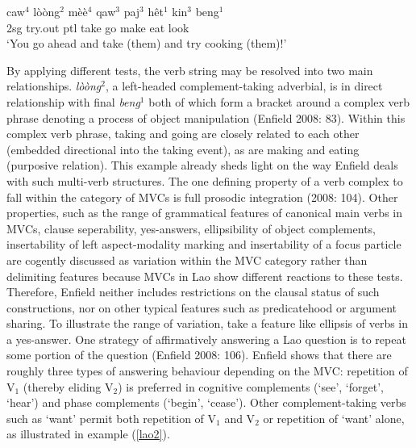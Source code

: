 \ea \label{lao1}
\gll caw$^4$ lòòng$^2$ mèè$^4$ qaw$^3$ paj$^3$ hêt$^1$ kin$^3$ beng$^1$ \\
\acs{2}\acs{sg} try.out \acs{ptl} take go make eat look \\
\glft `You go ahead and take (them) and try cooking (them)!' \\ 
\z
\xe

By applying different tests, the verb string may be resolved into two main relationships. \textit{lòòng$^2$}, a left-headed complement-taking adverbial, is in direct relationship with final \textit{beng$^1$} both of which form a bracket around a complex verb phrase denoting a process of object manipulation (Enfield 2008: 83). Within this complex verb phrase, taking and going are closely related to each other (embedded directional into the taking event), as are making and eating (purposive relation). This example already sheds light on the way Enfield deals with such multi-verb structures. The one defining property of a verb complex to fall within the category of MVCs is full prosodic integration (2008: 104). Other properties, such as the range of grammatical features of canonical main verbs in MVCs, clause seperability, yes-answers, ellipsibility of object complements, insertability of left aspect-modality marking and insertability of a focus particle are cogently discussed as variation within the MVC category rather than delimiting features because MVCs in Lao show different reactions to these tests. Therefore, Enfield neither includes restrictions on the clausal status of such constructions, nor on other typical features such as predicatehood or argument sharing. To illustrate the range of variation, take a feature like ellipsis of verbs in a yes-answer. One strategy of affirmatively answering a Lao question is to repeat some portion of the question (Enfield 2008: 106). Enfield shows that there  are roughly three types of answering behaviour depending on the MVC: repetition of V$_1$ (thereby eliding V$_2$) is preferred in cognitive complements (`see', `forget', `hear') and phase complements (`begin', `cease'). Other complement-taking verbs such as `want' permit both repetition of  V$_1$ and V$_2$ or repetition of `want' alone, as illustrated in example (\ref{lao2}). 

